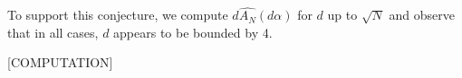 \documentclass{article}
\theoremstyle{definition}
\theoremstyle{remark}
\numberwithin{equation}{section}
\begin{document}






To support this conjecture, we compute $d \widehat{A_N}(d\alpha)$ for
$d$ up to $\sqrt{N}$ and observe that in all cases, $d$ appears to be
bounded by 4.  

[COMPUTATION]
\end{document}
